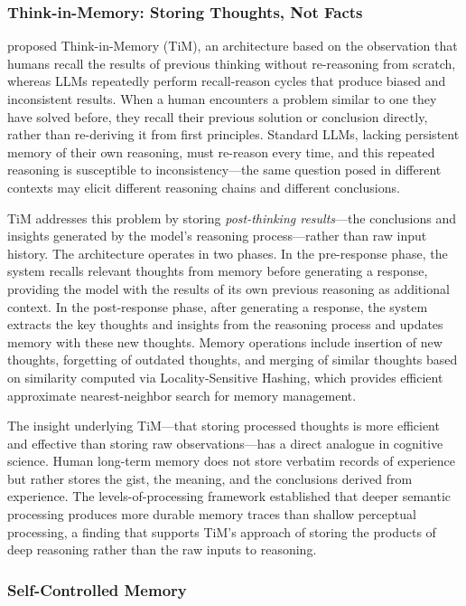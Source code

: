 \documentclass[11pt,letterpaper]{article}
\begin{document}
\subsubsection{Think-in-Memory: Storing Thoughts, Not Facts}

\cite{liu2023thinkinmemory} proposed Think-in-Memory (TiM), an architecture based on the observation that humans recall the results of previous thinking without re-reasoning from scratch, whereas LLMs repeatedly perform recall-reason cycles that produce biased and inconsistent results. When a human encounters a problem similar to one they have solved before, they recall their previous solution or conclusion directly, rather than re-deriving it from first principles. Standard LLMs, lacking persistent memory of their own reasoning, must re-reason every time, and this repeated reasoning is susceptible to inconsistency---the same question posed in different contexts may elicit different reasoning chains and different conclusions.

TiM addresses this problem by storing \emph{post-thinking results}---the conclusions and insights generated by the model's reasoning process---rather than raw input history. The architecture operates in two phases. In the pre-response phase, the system recalls relevant thoughts from memory before generating a response, providing the model with the results of its own previous reasoning as additional context. In the post-response phase, after generating a response, the system extracts the key thoughts and insights from the reasoning process and updates memory with these new thoughts. Memory operations include insertion of new thoughts, forgetting of outdated thoughts, and merging of similar thoughts based on similarity computed via Locality-Sensitive Hashing, which provides efficient approximate nearest-neighbor search for memory management.

The insight underlying TiM---that storing processed thoughts is more efficient and effective than storing raw observations---has a direct analogue in cognitive science. Human long-term memory does not store verbatim records of experience but rather stores the gist, the meaning, and the conclusions derived from experience. The levels-of-processing framework \cite{craik1972levels} established that deeper semantic processing produces more durable memory traces than shallow perceptual processing, a finding that supports TiM's approach of storing the products of deep reasoning rather than the raw inputs to reasoning.

\subsubsection{Self-Controlled Memory}
\end{document}
